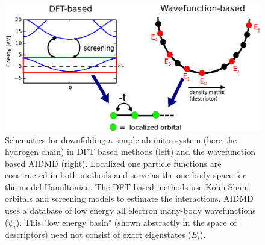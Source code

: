 \begin{figure}[htpb]
\centering
\includegraphics[width=1\linewidth]{./Figures/figure1.eps}
\caption{Schematics for downfolding a simple ab-initio system (here the hydrogen chain) 
in DFT based methods (left) and the wavefunction based AIDMD (right). Localized one particle functions 
are constructed in both methods and serve as the one body space for the model Hamiltonian. The DFT based methods 
use Kohn Sham orbitals and screening models to estimate the interactions. AIDMD uses a database of low energy 
all electron many-body wavefunctions ($\psi_i$). This "low energy basin" 
(shown abstractly in the space of descriptors) need not consist of exact eigenstates ($E_i$).}
\label{fig:lowenergybasin_schematic}
\end{figure}	



